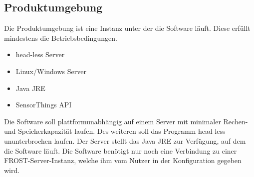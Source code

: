 \documentclass[12 pt]{article}
\begin{document}
\subsection{Produktumgebung}
Die Produktumgebung ist eine Instanz unter der die Software läuft. Diese erfüllt mindestens die Betriebsbedingungen.
\begin{itemize}
\item head-less Server
\item Linux/Windows Server
\item Java JRE
\item SensorThings API
\end{itemize}
Die Software soll plattformunabhängig auf einem Server mit minimaler Rechen- und Speicherkapazität laufen. Des weiteren soll das Programm head-less ununterbrochen laufen. Der Server stellt das Java JRE zur Verfügung, auf dem die Software läuft. Die Software benötigt nur noch eine Verbindung zu einer FROST-Server-Instanz, welche ihm vom Nutzer in der Konfiguration gegeben wird.
\end{document}
